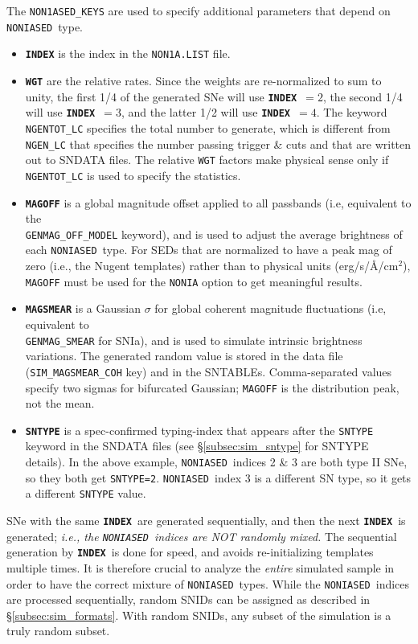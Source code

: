\documentclass[12pt]{article}
\newcommand{\NONIA}{{\tt NONIASED}}
\newcommand{\indx}{{\bf\tt INDEX}}
\begin{document}
\medskip
The {\tt NON1ASED\_KEYS} are used to specify additional parameters 
that depend on \NONIA\ type. 
\begin{itemize}
 \item {\tt\bf INDEX} is the index in the {\tt NON1A.LIST} file.
%
 \item {\tt\bf WGT} are the relative rates.
   Since the weights are re-normalized to sum to unity,
   the first 1/4 of the generated SNe will use \indx\ $=2$,
   the second 1/4 will use \indx\ $=3$,
   and the latter 1/2 will use \indx\ $=4$.
   The keyword {\tt NGENTOT\_LC} specifies the total number
   to generate, which is different from {\tt NGEN\_LC} that
   specifies the number passing trigger \& cuts and that are
   written out to SNDATA files.  The relative {\tt WGT} factors
   make physical sense only if {\tt NGENTOT\_LC} is used to specify
   the statistics.  
%
  \item {\tt\bf MAGOFF} is a global magnitude offset applied to
     all passbands 
     (i.e, equivalent to the \\ {\tt GENMAG\_OFF\_MODEL} keyword), 
     and is used to adjust the average brightness of each \NONIA\ type.
     For SEDs that are normalized to have a peak mag of zero
     (i.e., the Nugent templates) rather than to physical units
     (erg/s/\AA/cm$^2$), {\tt MAGOFF} must be used for the 
     {\tt NONIA} option to get meaningful results.
%
   \item {\tt\bf MAGSMEAR} is a Gaussian $\sigma$ for global coherent 
        magnitude fluctuations (i.e, equivalent to \\
       {\tt GENMAG\_SMEAR} for SNIa),
       and is used to simulate intrinsic brightness variations.
       The generated random value is stored in the data file
       ({\tt SIM\_MAGSMEAR\_COH} key) and in the SNTABLEs.
       Comma-separated values specify two sigmas for bifurcated Gaussian;
       {\tt MAGOFF} is the distribution peak, not the mean.
%
  \item {\tt\bf SNTYPE} is a spec-confirmed typing-index that appears
       after the {\tt SNTYPE} keyword in the 
       SNDATA files (see \S\ref{subsec:sim_sntype} for SNTYPE details).
       In the above example, \NONIA\ indices 2 \& 3 are both 
       type II SNe, so they both get {\tt SNTYPE=2}.
       \NONIA\ index 3 is a different SN type, so it gets a different
       {\tt SNTYPE} value.  
\end{itemize}


SNe with the same \indx\ are generated sequentially,
and then the next \indx\ is generated;
{\it i.e., the \NONIA\ indices are NOT randomly mixed.}
The sequential generation by \indx\ is done for speed,
and avoids re-initializing templates multiple times.
It is therefore crucial to analyze the {\it entire}
simulated sample in order to have the correct mixture
of \NONIA\ types.
While the \NONIA\ indices are processed sequentially,
random SNIDs can be assigned as described in   
\S\ref{subsec:sim_formats}. With random SNIDs,
any subset of the simulation is a truly random subset.
\end{document}
